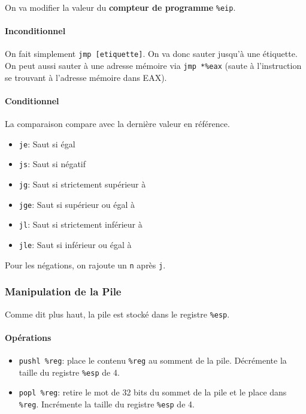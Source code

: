 On va modifier la valeur du \textbf{compteur de programme}
\texttt{\%eip}.

\paragraph{Inconditionnel}\label{inconditionnel}

On fait simplement \texttt{jmp\ {[}etiquette{]}}. On va donc sauter
jusqu'à une étiquette. On peut aussi sauter à une adresse mémoire via
\texttt{jmp\ *\%eax} (saute à l'instruction se trouvant à l'adresse
mémoire dans EAX).

\paragraph{Conditionnel}\label{conditionnel}

La comparaison compare avec la dernière valeur en référence.

\begin{itemize}
\tightlist
\item
  \texttt{je}: Saut si égal
\item
  \texttt{js}: Saut si négatif
\item
  \texttt{jg}: Saut si strictement supérieur à
\item
  \texttt{jge}: Saut si supérieur ou égal à
\item
  \texttt{jl}: Saut si strictement inférieur à
\item
  \texttt{jle}: Saut si inférieur ou égal à
\end{itemize}

Pour les négations, on rajoute un \texttt{n} après \texttt{j}.

\subsubsection{Manipulation de la Pile}\label{manipulation-de-la-pile}

Comme dit plus haut, la pile est stocké dans le registre \texttt{\%esp}.

\paragraph{Opérations}\label{opuxe9rations}

\begin{itemize}
\tightlist
\item
  \texttt{pushl\ \%reg}: place le contenu \texttt{\%reg} au somment de
  la pile. Décrémente la taille du registre \texttt{\%esp} de 4.
\item
  \texttt{popl\ \%reg}: retire le mot de 32 bits du sommet de la pile et
  le place dans \texttt{\%reg}. Incrémente la taille du registre
  \texttt{\%esp} de 4.
\end{itemize}

